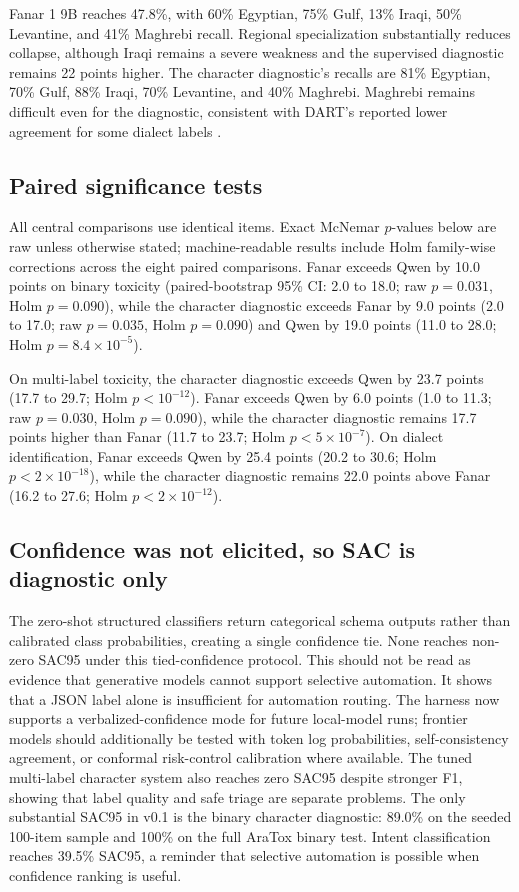 \documentclass[10pt,twocolumn]{article}
\begin{document}
Fanar 1 9B reaches 47.8\%, with 60\% Egyptian, 75\% Gulf, 13\% Iraqi, 50\%
Levantine, and 41\% Maghrebi recall. Regional specialization substantially
reduces collapse, although Iraqi remains a severe weakness and the supervised
diagnostic remains 22 points higher. The character diagnostic's recalls are
81\% Egyptian, 70\% Gulf, 88\% Iraqi, 70\% Levantine, and 40\% Maghrebi.
Maghrebi remains difficult even for the diagnostic, consistent with DART's
reported lower agreement for some dialect labels \citep{dart2018}.

\subsection{Paired significance tests}
All central comparisons use identical items. Exact McNemar $p$-values below
are raw unless otherwise stated; machine-readable results include Holm
family-wise corrections across the eight paired comparisons. Fanar exceeds
Qwen by 10.0 points on binary toxicity (paired-bootstrap 95\% CI: 2.0 to 18.0;
raw $p=0.031$, Holm $p=0.090$), while the character diagnostic exceeds Fanar
by 9.0 points (2.0 to 17.0; raw $p=0.035$, Holm $p=0.090$) and Qwen by 19.0
points (11.0 to 28.0; Holm $p=8.4\times10^{-5}$).

On multi-label toxicity, the character diagnostic exceeds Qwen by 23.7 points
(17.7 to 29.7; Holm $p<10^{-12}$). Fanar exceeds Qwen by 6.0 points (1.0 to
11.3; raw $p=0.030$, Holm $p=0.090$), while the character diagnostic remains
17.7 points higher than Fanar (11.7 to 23.7; Holm $p<5\times10^{-7}$). On
dialect identification, Fanar exceeds Qwen by 25.4 points (20.2 to 30.6; Holm
$p<2\times10^{-18}$), while the character diagnostic remains 22.0 points above
Fanar (16.2 to 27.6; Holm $p<2\times10^{-12}$).

\subsection{Confidence was not elicited, so SAC is diagnostic only}
The zero-shot structured classifiers return categorical schema outputs rather
than calibrated class probabilities, creating a single confidence tie. None
reaches non-zero SAC95 under this tied-confidence protocol. This should not be
read as evidence that generative models cannot support selective automation.
It shows that a JSON label alone is insufficient for automation routing. The
harness now supports a verbalized-confidence mode for future local-model runs;
frontier models should additionally be tested with token log probabilities,
self-consistency agreement, or conformal risk-control calibration where
available. The tuned multi-label character system also reaches zero SAC95
despite stronger F1, showing that label quality and safe triage are separate
problems. The only substantial SAC95 in v0.1 is the binary character
diagnostic: 89.0\% on the seeded 100-item sample and 100\% on the full AraTox
binary test. Intent classification reaches 39.5\% SAC95, a reminder that
selective automation is possible when confidence ranking is useful.
\end{document}
